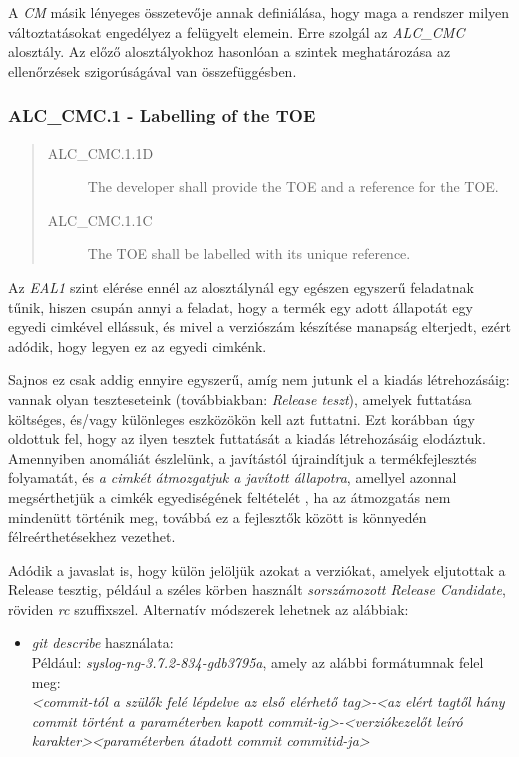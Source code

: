 A \emph{CM} másik lényeges összetevője annak definiálása, hogy maga a rendszer milyen
változtatásokat engedélyez a felügyelt elemein. Erre szolgál az \emph{ALC\_CMC} alosztály.
Az előző alosztályokhoz hasonlóan a szintek meghatározása az ellenőrzések szigorúságával van
összefüggésben.

\subsubsection{ALC\_CMC.1 - Labelling of the TOE}
\begin{quote}
    \begin{description}
        \item[ALC\_CMC.1.1D]{The developer shall provide the TOE and a reference for the TOE.}
        \item[ALC\_CMC.1.1C]{The TOE shall be labelled with its unique reference.}
    \end{description}
\end{quote}

Az \emph{EAL1} szint elérése ennél az alosztálynál egy egészen egyszerű feladatnak tűnik, hiszen
csupán annyi a feladat, hogy a termék egy adott állapotát egy egyedi cimkével ellássuk, és mivel
a verziószám készítése manapság elterjedt, ezért adódik, hogy legyen ez az egyedi cimkénk.

Sajnos ez csak addig ennyire egyszerű, amíg nem jutunk el a kiadás létrehozásáig: vannak olyan
teszteseteink (továbbiakban: \emph{Release teszt}), amelyek futtatása költséges, és/vagy különleges
eszközökön kell azt futtatni. Ezt korábban úgy oldottuk fel, hogy az ilyen tesztek futtatását
a kiadás létrehozásáig elodáztuk.  Amennyiben anomáliát észlelünk, a javítástól újraindítjuk
a termékfejlesztés folyamatát, és \emph{a cimkét átmozgatjuk a javított állapotra}, amellyel azonnal
megsérthetjük a cimkék egyediségének feltételét , ha az átmozgatás nem mindenütt történik meg,
továbbá ez a fejlesztők között is könnyedén félreérthetésekhez vezethet.

Adódik a javaslat is, hogy külön jelöljük azokat a verziókat, amelyek eljutottak a Release tesztig,
például a széles körben használt \emph{sorszámozott Release Candidate}, röviden \emph{rc}
szuffixszel.
Alternatív módszerek lehetnek az alábbiak:
\begin{itemize}
    \item \emph{git describe} használata: \\
        Például: \emph{syslog-ng-3.7.2-834-gdb3795a}, amely az alábbi formátumnak felel meg: \\
        \emph{<commit-tól a szülők felé lépdelve az első elérhető tag>-<az elért tagtől hány commit
            történt a paraméterben kapott commit-ig>-<verziókezelőt leíró karakter><paraméterben
        átadott commit commitid-ja>}
\end{itemize}

